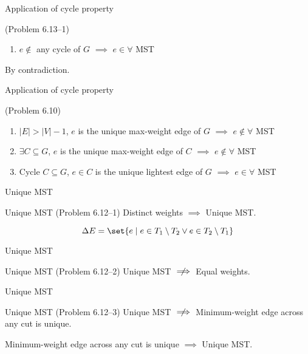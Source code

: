 \begin{frame}{Application of cycle property}
  \begin{exampleblock}{(Problem 6.13--1)}
	\begin{enumerate}[(1)]
	  \item $e \notin$ any cycle of $G$ $\implies$ $e \in \forall$ MST
	\end{enumerate}
  \end{exampleblock}

  \centerline{By contradiction.}
\end{frame}
\begin{frame}{Application of cycle property}
  \begin{exampleblock}{(Problem 6.10)}
	\begin{enumerate}[(1)]
	  \item $|E| > |V| - 1$, $e$ is the unique max-weight edge of $G$ $\implies$ $e \notin \forall$ MST
	  \item $\exists C \subseteq G$, $e$ is the unique max-weight edge of $C$ $\implies$ $e \notin \forall$ MST
	  \setcounter{enumi}{4}
	  \item Cycle $C \subseteq G$, $e \in C$ is the unique lightest edge of $G$ $\implies$ $e \in \forall$ MST
	\end{enumerate}
  \end{exampleblock}
\end{frame}
\begin{frame}{Unique MST}
  \begin{exampleblock}{Unique MST (Problem 6.12--1)}
    Distinct weights $\implies$ Unique MST.
  \end{exampleblock}

  \[
	\Delta E = \set{e \mid e \in T_1 \setminus T_2 \lor e \in T_2 \setminus T_1}
  \]
\end{frame}
\begin{frame}{Unique MST}
  \begin{exampleblock}{Unique MST (Problem 6.12--2)}
	Unique MST $\centernot\implies$ Equal weights.
  \end{exampleblock}

\end{frame}
\begin{frame}{Unique MST}
  \begin{exampleblock}{Unique MST (Problem 6.12--3)}
	Unique MST $\centernot\implies$ Minimum-weight edge across any cut is unique.
  \end{exampleblock}


  \begin{theorem}
    Minimum-weight edge across any cut is unique $\implies$ Unique MST.
  \end{theorem}
\end{frame}
